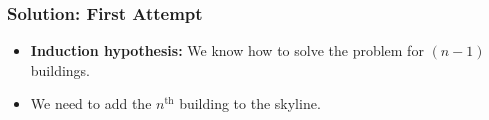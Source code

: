 \documentclass{beamer}
\begin{document}
\begin{frame}
\frametitle{Solution: First Attempt}

\begin{itemize}

\item \textbf{Induction hypothesis:} We know how to solve the problem for $(n-1)$ buildings.
\vspace{0.2cm}
\item We need to add the $n^{\textrm{th}}$ building to the skyline.

\begin{center}
\end{center}


\end{itemize}

\end{frame}
\end{document}
